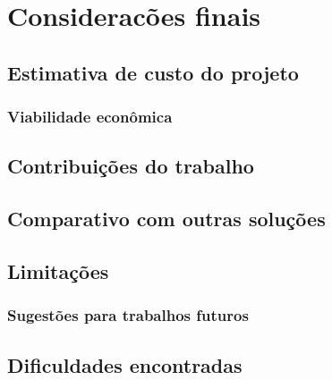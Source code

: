 \chapter[Considerações finais]{Consideracões finais}

  \section{Estimativa de custo do projeto}
  
    \subsection{Viabilidade econômica}
  
  \section{Contribuições do trabalho}
  
  \section{Comparativo com outras soluções}
  
  \section{Limitações}
  
    \subsection{Sugestões para trabalhos futuros}
  
  \section{Dificuldades encontradas}